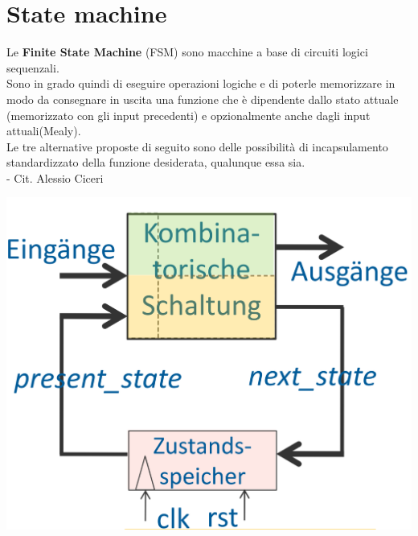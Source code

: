 \section{State machine}
    \begin{minipage}[t]{0.48\columnwidth}
        \vspace{0pt} %
        Le \textbf{Finite State Machine} (FSM) sono macchine a base di circuiti logici sequenzali.\\
        Sono in grado quindi 
        di eseguire operazioni logiche e di poterle memorizzare in modo da consegnare in uscita una funzione
        che è dipendente dallo stato attuale (memorizzato con gli input precedenti) e opzionalmente anche dagli input attuali(Mealy).\\
        Le tre alternative proposte di seguito sono delle possibilità di incapsulamento standardizzato
        della funzione desiderata, qualunque essa sia.\\
        - Cit. Alessio Ciceri
    \end{minipage}
    \hfill
    \begin{minipage}[t]{0.48\columnwidth}
        \vspace{0pt} %
        \includegraphics[width=\linewidth]{Images/FSMGeneralizzata.png}
    \end{minipage}%


